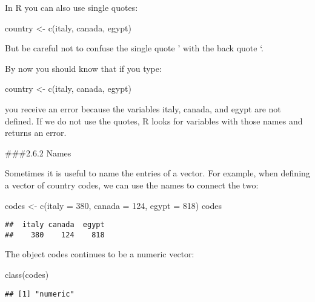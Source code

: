 \documentclass[
]{article}
\newenvironment{Shaded}{\begin{snugshade}}{\end{snugshade}}
\newcommand{\AttributeTok}[1]{\textcolor[rgb]{0.77,0.63,0.00}{#1}}
\newcommand{\DecValTok}[1]{\textcolor[rgb]{0.00,0.00,0.81}{#1}}
\newcommand{\FunctionTok}[1]{\textcolor[rgb]{0.00,0.00,0.00}{#1}}
\newcommand{\NormalTok}[1]{#1}
\newcommand{\OtherTok}[1]{\textcolor[rgb]{0.56,0.35,0.01}{#1}}
\newcommand{\StringTok}[1]{\textcolor[rgb]{0.31,0.60,0.02}{#1}}
\begin{document}
In R you can also use single quotes:

\begin{Shaded}
\begin{Highlighting}[]
\NormalTok{country }\OtherTok{\textless{}{-}} \FunctionTok{c}\NormalTok{(}\StringTok{\textquotesingle{}italy\textquotesingle{}}\NormalTok{, }\StringTok{\textquotesingle{}canada\textquotesingle{}}\NormalTok{, }\StringTok{\textquotesingle{}egypt\textquotesingle{}}\NormalTok{)}
\end{Highlighting}
\end{Shaded}

But be careful not to confuse the single quote ' with the back quote `.

By now you should know that if you type:

country \textless- c(italy, canada, egypt)

you receive an error because the variables italy, canada, and egypt are
not defined. If we do not use the quotes, R looks for variables with
those names and returns an error.

\#\#\#2.6.2 Names

Sometimes it is useful to name the entries of a vector. For example,
when defining a vector of country codes, we can use the names to connect
the two:

\begin{Shaded}
\begin{Highlighting}[]
\NormalTok{codes }\OtherTok{\textless{}{-}} \FunctionTok{c}\NormalTok{(}\AttributeTok{italy =} \DecValTok{380}\NormalTok{, }\AttributeTok{canada =} \DecValTok{124}\NormalTok{, }\AttributeTok{egypt =} \DecValTok{818}\NormalTok{)}
\NormalTok{codes}
\end{Highlighting}
\end{Shaded}

\begin{verbatim}
##  italy canada  egypt 
##    380    124    818
\end{verbatim}

The object codes continues to be a numeric vector:

\begin{Shaded}
\begin{Highlighting}[]
\FunctionTok{class}\NormalTok{(codes)}
\end{Highlighting}
\end{Shaded}

\begin{verbatim}
## [1] "numeric"
\end{verbatim}
\end{document}
